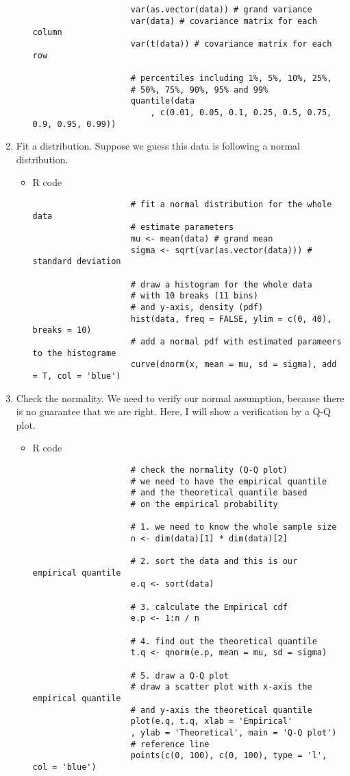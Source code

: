 \begin{enumerate}
\begin{itemize}
\begin{verbatim}
					var(as.vector(data)) # grand variance
					var(data) # covariance matrix for each column
					var(t(data)) # covariance matrix for each row
					
					# percentiles including 1%, 5%, 10%, 25%, 
					# 50%, 75%, 90%, 95% and 99%
					quantile(data 
						, c(0.01, 0.05, 0.1, 0.25, 0.5, 0.75, 0.9, 0.95, 0.99)) 
				\end{verbatim}
		\end{itemize}
	\item Fit a distribution. Suppose we guess this data is following a normal distribution.
		\begin{itemize}
			\item R code
				\begin{verbatim}
					# fit a normal distribution for the whole data 
					# estimate parameters
					mu <- mean(data) # grand mean
					sigma <- sqrt(var(as.vector(data))) # standard deviation
					
					# draw a histogram for the whole data 
					# with 10 breaks (11 bins) 
					# and y-axis, density (pdf)
					hist(data, freq = FALSE, ylim = c(0, 40), breaks = 10)
					# add a normal pdf with estimated parameers to the histograme
					curve(dnorm(x, mean = mu, sd = sigma), add = T, col = 'blue')
				\end{verbatim}
		\end{itemize}
	\item Check the normality. We need to verify our normal assumption, because there is no guarantee that we are right. Here, I will show a verification by a Q-Q plot.
		\begin{itemize}
			\item R code
				\begin{verbatim}
					# check the normality (Q-Q plot)
					# we need to have the empirical quantile 
					# and the theoretical quantile based 
					# on the empirical probability
					
					# 1. we need to know the whole sample size
					n <- dim(data)[1] * dim(data)[2]
					
					# 2. sort the data and this is our empirical quantile
					e.q <- sort(data)
					
					# 3. calculate the Empirical cdf
					e.p <- 1:n / n
					
					# 4. find out the theoretical quantile
					t.q <- qnorm(e.p, mean = mu, sd = sigma)
					
					# 5. draw a Q-Q plot
					# draw a scatter plot with x-axis the empirical quantile 
					# and y-axis the theoretical quantile
					plot(e.q, t.q, xlab = 'Empirical'
					, ylab = 'Theoretical', main = 'Q-Q plot')
					# reference line
					points(c(0, 100), c(0, 100), type = 'l', col = 'blue')
				\end{verbatim}
		\end{itemize}
\end{enumerate}